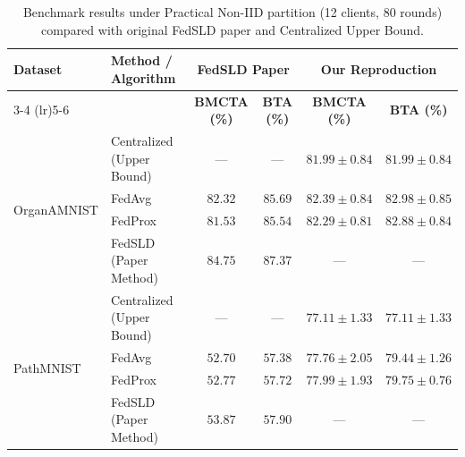 \begin{table}[htbp]
\centering
\small
\setlength{\tabcolsep}{4.5pt}
\caption{Benchmark results under Practical Non-IID partition (12 clients, 80 rounds) compared with original FedSLD paper and Centralized Upper Bound.}
\label{tab:fedsld_repro_comparison}
\begin{tabular}{llcccc}
\toprule
\multirow{2}{*}{\textbf{Dataset}} & \multirow{2}{*}{\textbf{Method / Algorithm}} & \multicolumn{2}{c}{\textbf{FedSLD Paper \cite{luo2022fedsld}}} & \multicolumn{2}{c}{\textbf{Our Reproduction}} \\
\cmidrule(lr){3-4} \cmidrule(lr){5-6}
& & \textbf{BMCTA (\%)} & \textbf{BTA (\%)} & \textbf{BMCTA (\%)} & \textbf{BTA (\%)} \\
\midrule
\multirow{4}{*}{OrganAMNIST} & Centralized (Upper Bound) & --- & --- & $81.99 \pm 0.84$ & $81.99 \pm 0.84$ \\
                             & FedAvg                    & $82.32$ & $85.69$ & $82.39 \pm 0.84$ & $82.98 \pm 0.85$ \\
                             & FedProx                   & $81.53$ & $85.54$ & $82.29 \pm 0.81$ & $82.88 \pm 0.84$ \\
                             & FedSLD (Paper Method)     & $84.75$ & $87.37$ & --- & --- \\
\midrule
\multirow{4}{*}{PathMNIST}    & Centralized (Upper Bound) & --- & --- & $77.11 \pm 1.33$ & $77.11 \pm 1.33$ \\
                             & FedAvg                    & $52.70$ & $57.38$ & $77.76 \pm 2.05$ & $79.44 \pm 1.26$ \\
                             & FedProx                   & $52.77$ & $57.72$ & $77.99 \pm 1.93$ & $79.75 \pm 0.76$ \\
                             & FedSLD (Paper Method)     & $53.87$ & $57.90$ & --- & --- \\
\bottomrule
\end{tabular}
\end{table}

